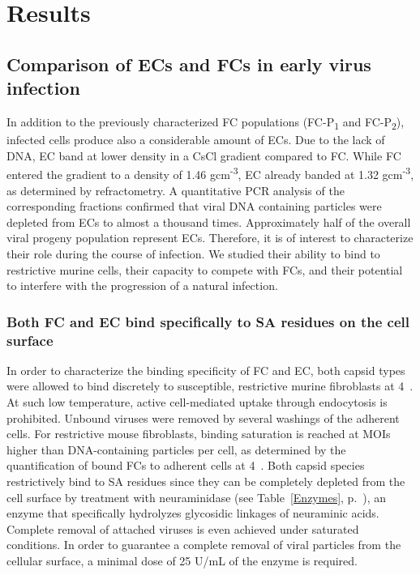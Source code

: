 
\chapter{Results} %

\label{Results} %



\section{Comparison of ECs and FCs in early virus infection}

In addition to the previously characterized FC populations (FC-P\textsubscript{1} and FC-P\textsubscript{2}), infected cells produce also a considerable amount of ECs. Due to the lack of DNA, EC band at lower density in a CsCl gradient compared to FC. While FC entered the gradient to a density of 1.46 gcm\textsuperscript{-3}, EC already banded at 1.32 gcm\textsuperscript{-3}, as determined by refractometry. A quantitative PCR analysis of the corresponding fractions confirmed that viral DNA containing particles were depleted from ECs to almost a thousand times. Approximately half of the overall viral progeny population represent ECs. Therefore, it is of interest to characterize their role during the course of infection. We studied their ability to bind to restrictive murine cells, their capacity to compete with FCs, and their potential to interfere with the progression of a natural infection.    

\subsection{Both FC and EC bind specifically to SA residues on the cell surface}
In order to characterize the binding specificity of FC and EC, both capsid types were allowed to bind discretely to susceptible, restrictive murine fibroblasts at 4~\textcelsius. At such low temperature, active cell-mediated uptake through endocytosis is prohibited. Unbound viruses were removed by several washings of the adherent cells. For restrictive mouse fibroblasts, binding saturation is reached at MOIs higher than  DNA-containing particles per cell, as determined by the quantification of bound FCs to adherent cells at 4~\textcelsius. Both capsid species restrictively bind to SA residues since they can be completely depleted from the cell surface by treatment with neuraminidase (see Table~\ref{Enzymes}, p.~\pageref{Enzymes}), an enzyme that specifically hydrolyzes glycosidic linkages of neuraminic acids. Complete removal of attached viruses is even achieved under saturated conditions. In order to guarantee a complete removal of viral particles from the cellular surface, a minimal dose of 25 U/mL of the enzyme is required.   

